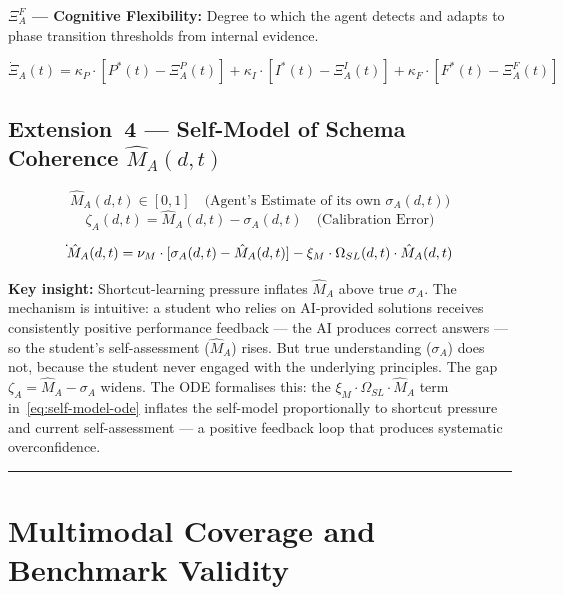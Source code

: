 \documentclass[10pt]{article}
\begin{document}
\textbf{$\Xi_A^F$ --- Cognitive Flexibility:} Degree to which the agent
detects and adapts to phase transition thresholds from internal evidence.

\begin{equation}\label{eq:executive-ode}
\dot{\Xi}_A(t) = \kappa_P \cdot [P^*(t) - \Xi_A^P(t)] + \kappa_I \cdot [I^*(t) - \Xi_A^I(t)] + \kappa_F \cdot [F^*(t) - \Xi_A^F(t)] %
\end{equation}

\subsection{Extension~4 --- Self-Model of Schema Coherence \texorpdfstring{$\hat{M}_A(d,t)$}{M-hat\_A(d,t)}}\label{sec:metacognition}

\begin{equation}\label{eq:self-model}
\hat{M}_A(d,t) \in [0,1] \quad \text{(Agent's Estimate of its own } \sigma_A(d,t))
\end{equation}
\begin{equation}\label{eq:calibration-error}
\zeta_A(d,t) = \hat{M}_A(d,t) - \sigma_A(d,t) \quad \text{(Calibration Error)}
\end{equation}

\begin{equation}\label{eq:self-model-ode}
\dot{\vphantom{M}}\hat{M}_A(d,t) = \nu_M \cdot [\sigma_A(d,t) - \hat{M}_A(d,t)] - \xi_M \cdot \Omega_{SL}(d,t) \cdot \hat{M}_A(d,t)
\end{equation}

\textbf{Key insight:} Shortcut-learning pressure inflates $\hat{M}_A$ above true
$\sigma_A$. The mechanism is intuitive: a student who relies on AI-provided
solutions receives consistently positive performance feedback --- the AI
produces correct answers --- so the student's self-assessment ($\hat{M}_A$)
rises. But true understanding ($\sigma_A$) does not, because the student
never engaged with the underlying principles. The gap $\zeta_A = \hat{M}_A - \sigma_A$
widens. The ODE formalises this: the $\xi_M \cdot \Omega_{SL} \cdot \hat{M}_A$ term
in~\eqref{eq:self-model-ode} inflates the self-model proportionally to
shortcut pressure and current self-assessment --- a positive feedback loop
that produces systematic overconfidence.



\noindent\rule{\linewidth}{0.4pt}

\section{Multimodal Coverage and Benchmark Validity}\label{sec:multimodal}
\end{document}
